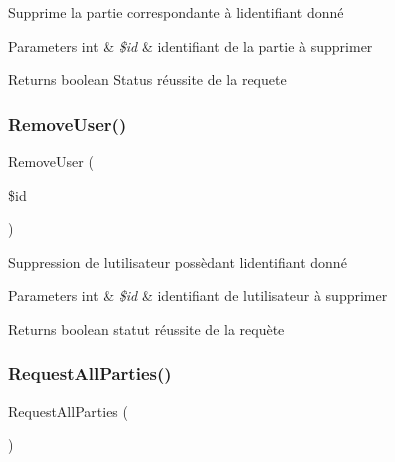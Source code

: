 Supprime la partie correspondante à l\textquotesingle{}identifiant donné 


\begin{DoxyParams}[1]{Parameters}
int & {\em \$id} & identifiant de la partie à supprimer\\
\hline
\end{DoxyParams}
\begin{DoxyReturn}{Returns}
boolean Status réussite de la requete 
\end{DoxyReturn}
\mbox{\label{class_interface_b_d_d_a1ce1781e4e653de271446486898f360e}} 
\subsubsection{\texorpdfstring{Remove\+User()}{RemoveUser()}}
{\footnotesize\ttfamily Remove\+User (\begin{DoxyParamCaption}\item[{}]{\$id }\end{DoxyParamCaption})}



Suppression de l\textquotesingle{}utilisateur possèdant l\textquotesingle{}identifiant donné 


\begin{DoxyParams}[1]{Parameters}
int & {\em \$id} & identifiant de l\textquotesingle{}utilisateur à supprimer\\
\hline
\end{DoxyParams}
\begin{DoxyReturn}{Returns}
boolean statut réussite de la requète 
\end{DoxyReturn}
\mbox{\label{class_interface_b_d_d_aa51770e0fe58671f8be78be72ab88973}} 
\subsubsection{\texorpdfstring{Request\+All\+Parties()}{RequestAllParties()}}
{\footnotesize\ttfamily Request\+All\+Parties (\begin{DoxyParamCaption}{ }\end{DoxyParamCaption})}



